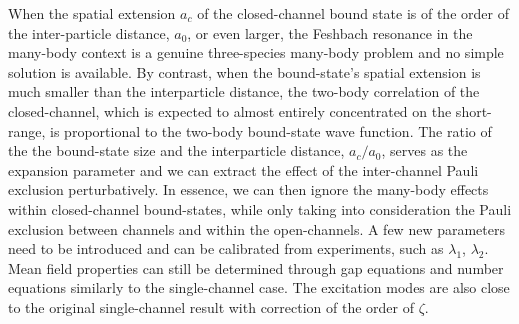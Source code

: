 \documentclass[reprint,pra]{revtex4-1}
\begin{document}
When the spatial extension $a_c$ of  the closed-channel bound state is  of the order of the   inter-particle distance, $a_{0}$, or even larger, the Feshbach resonance in the many-body context is a genuine three-species many-body problem and no simple solution is available.  By contrast, when the bound-state's spatial extension is much smaller than the interparticle distance, the two-body correlation of the closed-channel, which is expected to almost entirely concentrated on the short-range,  is proportional to  the two-body bound-state wave function. The ratio of the the bound-state size and the interparticle distance, $a_{c}/a_{0}$, serves as the expansion parameter and we can extract  the effect of the inter-channel Pauli exclusion perturbatively.  In essence, we can then  ignore the many-body effects within  closed-channel bound-states, while only taking into consideration  the Pauli exclusion between channels and within the open-channels.  A few new parameters need to be introduced and can be calibrated from experiments, such as $\lambda_{1}$, $\lambda_{2}$.  Mean field properties can still be determined through gap equations and number equations similarly to the single-channel case.  The excitation modes are also close to the original single-channel result with correction of the order of $\zeta$.
\end{document}

